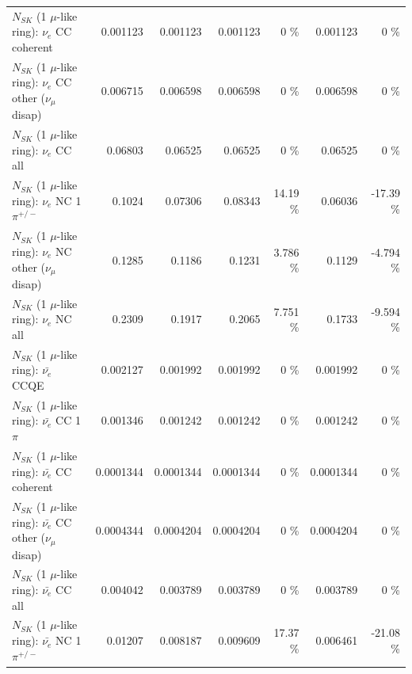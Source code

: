 \begin{table}
\begin{tabular}{| l | r | r | r  r | r  r |}
                               $N_{SK}$ (1 $\mu$-like ring): $\nu_e$ CC coherent &        0.001123 &        0.001123 &        0.001123 &        0 \%  &        0.001123 &        0 \%  \\ 
                $N_{SK}$ (1 $\mu$-like ring): $\nu_e$ CC other ($\nu_\mu$ disap) &        0.006715 &        0.006598 &        0.006598 &        0 \%  &        0.006598 &        0 \%  \\ 
                                  $N_{SK}$ (1 $\mu$-like ring): $\nu_{e}$ CC all &         0.06803 &         0.06525 &         0.06525 &        0 \%  &         0.06525 &        0 \%  \\ 
\hline
                           $N_{SK}$ (1 $\mu$-like ring): $\nu_e$ NC 1$\pi^{+/-}$ &          0.1024 &         0.07306 &         0.08343 &    14.19 \%  &         0.06036 &   -17.39 \%  \\ 
                $N_{SK}$ (1 $\mu$-like ring): $\nu_e$ NC other ($\nu_\mu$ disap) &          0.1285 &          0.1186 &          0.1231 &    3.786 \%  &          0.1129 &   -4.794 \%  \\ 
                                  $N_{SK}$ (1 $\mu$-like ring): $\nu_{e}$ NC all &          0.2309 &          0.1917 &          0.2065 &    7.751 \%  &          0.1733 &   -9.594 \%  \\ 
\hline
\hline
\hline
                                $N_{SK}$ (1 $\mu$-like ring): $\bar{\nu_e}$ CCQE &        0.002127 &        0.001992 &        0.001992 &        0 \%  &        0.001992 &        0 \%  \\ 
                           $N_{SK}$ (1 $\mu$-like ring): $\bar{\nu_e}$ CC 1$\pi$ &        0.001346 &        0.001242 &        0.001242 &        0 \%  &        0.001242 &        0 \%  \\ 
                         $N_{SK}$ (1 $\mu$-like ring): $\bar{\nu_e}$ CC coherent &       0.0001344 &       0.0001344 &       0.0001344 &        0 \%  &       0.0001344 &        0 \%  \\ 
          $N_{SK}$ (1 $\mu$-like ring): $\bar{\nu_e}$ CC other ($\nu_\mu$ disap) &       0.0004344 &       0.0004204 &       0.0004204 &        0 \%  &       0.0004204 &        0 \%  \\ 
                            $N_{SK}$ (1 $\mu$-like ring): $\bar{\nu_{e}}$ CC all &        0.004042 &        0.003789 &        0.003789 &        0 \%  &        0.003789 &        0 \%  \\ 
\hline
                     $N_{SK}$ (1 $\mu$-like ring): $\bar{\nu_e}$ NC 1$\pi^{+/-}$ &         0.01207 &        0.008187 &        0.009609 &    17.37 \%  &        0.006461 &   -21.08 \%  \\ 

\end{tabular}
\end{table}
